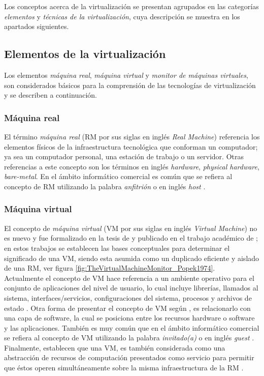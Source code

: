 Los conceptos acerca de la virtualización se presentan agrupados en las categorías \textit{elementos} y  \textit{técnicas de la virtualización}, cuya descripción se muestra en los apartados siguientes.


\subsection{Elementos de la virtualización}

Los elementos \textit{máquina real}, \textit{máquina virtual} y \textit{monitor de máquinas virtuales}, son considerados básicos para la comprensión de las tecnologías de virtualización y se describen a continuación.

\subsubsection{Máquina real}

El término \textit{máquina real} (RM por sus siglas en inglés \textit{Real Machine}) referencia los elementos físicos de la infraestructura tecnológica que conforman un computador; ya sea un computador personal, una estación de trabajo o un servidor. Otras referencias a este concepto son los términos en inglés \textit{hardware}, \textit{physical hardware}, \textit{bare-metal}. En el ámbito informático comercial es común que se refiera al concepto de RM utilizando la palabra \textit{anfitrión} o en inglés \textit{host} \parencite{VMware2008}. 

\subsubsection{Máquina virtual}

El concepto de \textit{máquina virtual} (VM por sus siglas en inglés \textit{Virtual Machine}) no es nuevo y fue formalizado en la tesis de  \textcite{Goldberg1973} y publicado en el trabajo académico de \textcite{Goldberg1974}; en estos trabajos se establecen las bases conceptuales para determinar el significado de una VM, siendo esta asumida como un duplicado eficiente y aislado de una RM, ver figura \ref{fig:TheVirtualMachineMonitor_Popek1974}.\\

Actualmente el concepto de VM hace referencia a un ambiente operativo para el conjunto de aplicaciones del nivel de usuario, lo cual incluye librerías, llamados al sistema, interfaces/servicios, configuraciones del sistema, procesos y archivos de estado \parencite{Chiueh2005}. Otra forma de presentar el concepto de VM según \textcite{Solis2014}, es relacionarlo con una capa de software, la cual se posiciona entre los recursos hardware o software y las aplicaciones. También es muy común que en el ámbito informático comercial se refiera al concepto de VM utilizando la palabra \textit{invitado(a)} o en inglés \textit{guest} \parencite{VMware2008}. Finalmente, \textcite{Pek2013} establecen que una VM, es también considerada como una abstracción de recursos de computación presentados como servicio para permitir que éstos operen simultáneamente sobre la misma infraestructura de la RM .


